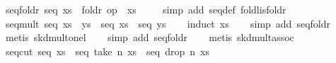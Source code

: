 \begin{isabellebody}
\endisatagproof
{\isafoldproof}%
%
\isadelimproof
\isanewline
%
\endisadelimproof
\isanewline
{}\isamarkupfalse%
\ seq{}foldr{}\ {}seq\ xs\ {}\ foldr\ op\ {}\ xs\ {}{}\isanewline
%
\isadelimproof
\ \ %
\endisadelimproof
%
\isatagproof
{}\isamarkupfalse%
\ {}simp\ add{}\ seq{}def\ foldl{}is{}foldr{}%
\endisatagproof
{\isafoldproof}%
%
\isadelimproof
\isanewline
%
\endisadelimproof
\isanewline
{}\isamarkupfalse%
\ seq{}mult{}\ {}seq\ {}xs\ {}\ ys{}\ {}\ seq\ xs\ {}\ seq\ ys{}\isanewline
%
\isadelimproof
\ \ %
\endisadelimproof
%
\isatagproof
{}\isamarkupfalse%
\ {}induct\ xs{}\isanewline
\ \ \isamarkupfalse%
\ {}simp\ add{}\ seq{}foldr{}\isanewline
\ \ \isamarkupfalse%
\ {}metis\ skd{}mult{}onel{}\isanewline
\ \ \isamarkupfalse%
\ {}simp\ add{}\ seq{}foldr{}\isanewline
\ \ \isamarkupfalse%
\ {}metis\ skd{}mult{}assoc{}%
\endisatagproof
{\isafoldproof}%
%
\isadelimproof
\isanewline
%
\endisadelimproof
\isanewline
{}\isamarkupfalse%
\ seq{}cut{}\ {}seq\ xs\ {}\ seq\ {}take\ n\ xs{}\ {}\ seq\ {}drop\ n\ xs{}{}\isanewline

\end{isabellebody}
